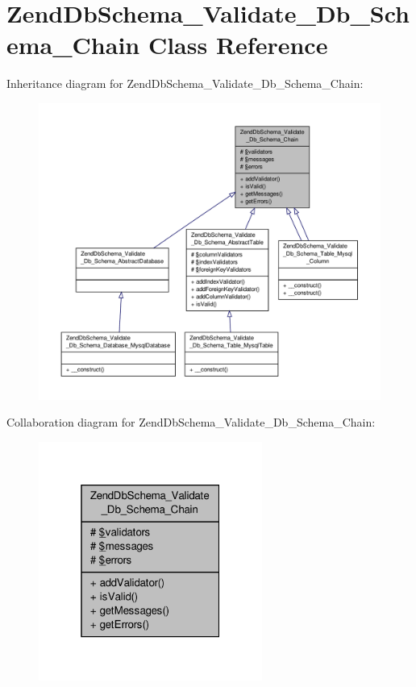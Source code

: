 \hypertarget{classZendDbSchema__Validate__Db__Schema__Chain}{\section{Zend\-Db\-Schema\-\_\-\-Validate\-\_\-\-Db\-\_\-\-Schema\-\_\-\-Chain Class Reference}
\label{classZendDbSchema__Validate__Db__Schema__Chain}
}


Inheritance diagram for Zend\-Db\-Schema\-\_\-\-Validate\-\_\-\-Db\-\_\-\-Schema\-\_\-\-Chain\-:\nopagebreak
\begin{figure}[H]
\begin{center}
\leavevmode
\includegraphics[width=350pt]{classZendDbSchema__Validate__Db__Schema__Chain__inherit__graph}
\end{center}
\end{figure}


Collaboration diagram for Zend\-Db\-Schema\-\_\-\-Validate\-\_\-\-Db\-\_\-\-Schema\-\_\-\-Chain\-:\nopagebreak
\begin{figure}[H]
\begin{center}
\leavevmode
\includegraphics[width=208pt]{classZendDbSchema__Validate__Db__Schema__Chain__coll__graph}
\end{center}
\end{figure}
